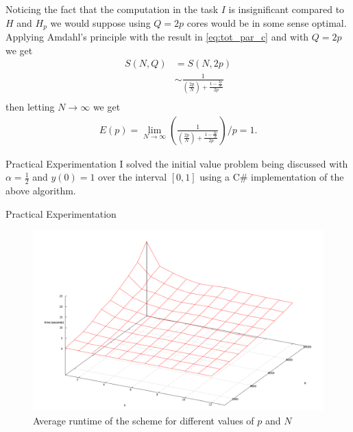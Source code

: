 \documentclass[pdf]{beamer}
\newcommand{\lra}{\longrightarrow}
\begin{document}
\begin{frame}
Noticing the fact that the computation in the task $ I $ is insignificant compared to $ H $ and $ H_p $ we would suppose using $ Q = 2p $ cores would be in some sense optimal. Applying Amdahl's principle with the result in \ref{eq:tot_par_c} and with $ Q = 2p $ we get 
\begin{align*}
    S(N, Q) &= S(N, 2p) \\
    &\sim \frac{1}{(\frac{2p}{N}) + \frac{1-\frac{2p}{N}}{2p} } \\
\end{align*}
then letting $ N \lra \infty $ we get
\begin{align*}
    E(p) = \lim_{N \lra \infty} \left(\frac{1}{(\frac{2p}{N}) + \frac{1-\frac{2p}{N}}{2p} } \right) \slash p = 1.
\end{align*}
\end{frame}

\begin{frame}{Practical Experimentation}
I solved the initial value problem being discussed with $ \alpha = \frac{1}{2} $ and $ y(0) = 1 $ over the interval $ [0, 1] $ using a C\# implementation of the above algorithm.
\end{frame}
\begin{frame}{Practical Experimentation}
\begin{figure}[H]
\includegraphics[scale = 0.2]{../images/Dot_Net_Performance_No_Label}
\caption{Average runtime of the scheme for different values of $ p $ and $ N $}
\label{fig:mono_performance_surface}
\end{figure}
\end{frame}
\end{document}
